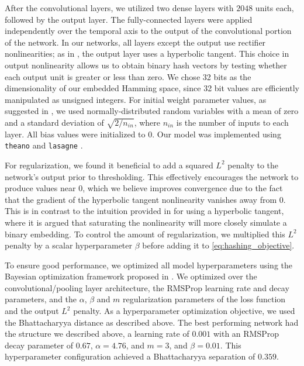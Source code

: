 After the convolutional layers, we utilized two dense layers with $2048$ units each, followed by the output layer.
The fully-connected layers were applied independently over the temporal axis to the output of the convolutional portion of the network.
In our networks, all layers except the output use rectifier nonlinearities; as in \cite{masci2014multimodal}, the output layer uses a hyperbolic tangent.
This choice in output nonlinearity allows us to obtain binary hash vectors by testing whether each output unit is greater or less than zero.
We chose 32 bits as the dimensionality of our embedded Hamming space, since 32 bit values are efficiently manipulated as unsigned integers.
For initial weight parameter values, as suggested in \cite{he2015delving}, we used normally-distributed random variables with a mean of zero and a standard deviation of $\sqrt{2/n_{in}}$, where $n_{in}$ is the number of inputs to each layer.
All bias values were initialized to $0$.
Our model was implemented using \texttt{theano} \cite{bastien2012theano,bergstra2010theano} and \texttt{lasagne} \cite{dieleman2015lasagne}.

For regularization, we found it beneficial to add a squared $L^2$ penalty to the network's output prior to thresholding.
This effectively encourages the network to produce values near 0, which we believe improves convergence due to the fact that the gradient of the hyperbolic tangent nonlinearity vanishes away from 0.
This is in contrast to the intuition provided in \cite{masci2014multimodal} for using a hyperbolic tangent, where it is argued that saturating the nonlinearity will more closely simulate a binary embedding.
To control the amount of regularization, we multiplied this $L^2$ penalty by a scalar hyperparameter $\beta$ before adding it to \cref{eq:hashing_objective}.

To ensure good performance, we optimized all model hyperparameters using the Bayesian optimization framework proposed in \cite{snoek2012practical}.
We optimized over the convolutional/pooling layer architecture, the RMSProp learning rate and decay parameters, and the $\alpha$, $\beta$ and $m$ regularization parameters of the loss function and the output $L^2$ penalty.
As a hyperparameter optimization objective, we used the Bhattacharyya distance as described above.
The best performing network had the structure we described above, a learning rate of $0.001$ with an RMSProp decay parameter of $0.67$, $\alpha = 4.76$, and $m = 3$, and $\beta = 0.01$.
This hyperparameter configuration achieved a Bhattacharyya separation of $0.359$.

